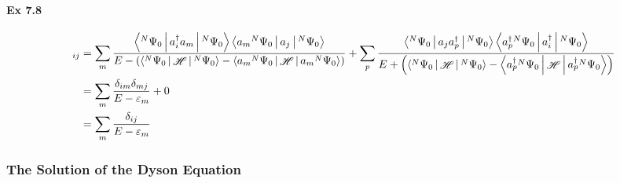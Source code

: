 \documentclass[a4paper]{article}
\DeclareMathOperator{\sH}{\mathscr{H}}
\newcommand{\ex}[1]{\paragraph{Ex #1}}
\numberwithin{equation}{subsection}
\begin{document}
\ex{7.8}
\begin{align}
[\vb{G}_0(E)]_{ij} &= \sum_m 
\dfrac{\Braket{^N\Psi_0 | a_i^\dagger a_m | ^N\Psi_0} 
	\Braket{a_m {^N\Psi}_0| a_j | ^N\Psi_0}
}{E - \qty(\Braket{^N\Psi_0|\sH |^N\Psi_0} 
- \Braket{a_m {^N\Psi}_0|\sH|a_m {^N\Psi}_0} )}
+ \sum_p
\dfrac{\Braket{^N\Psi_0 | a_j a_p^\dagger | ^N\Psi_0} 
	\Braket{a_p^\dagger {^N\Psi}_0| a_i^\dagger | ^N\Psi_0}
}{E + \qty(\Braket{^N\Psi_0|\sH |^N\Psi_0} 
	- \Braket{a_p^\dagger {^N\Psi}_0|\sH|a_p^\dagger {^N\Psi}_0} )} \notag\\
&= \sum_m \dfrac{\delta_{im}\delta_{mj}}{E - \varepsilon_m} + 0 \notag\\
&= \sum_m \dfrac{\delta_{ij}}{E - \varepsilon_m}
\end{align}

\subsubsection{The Solution of the Dyson Equation}
\end{document}
